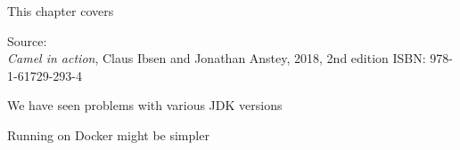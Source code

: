 \documentclass[Screen16to9,17pt]{foils}
\begin{document}

This chapter covers
\begin{list2}
\item
\end{list2}

Source: {\footnotesize\\
\emph{Camel in action}, Claus Ibsen and Jonathan Anstey, 2018, 2nd edition
ISBN: 978-1-61729-293-4}





\begin{quote}

\end{quote}

\begin{list2}
  \item We have seen problems with various JDK versions
  \item Running on Docker might be simpler
\end{list2}





\begin{quote}

  \end{quote}

  \begin{list2}
    \item
    \end{list2}




    \begin{quote}

    \end{quote}

    \begin{list2}
      \item
    \end{list2}



\begin{quote}

  \end{quote}
\end{document}
